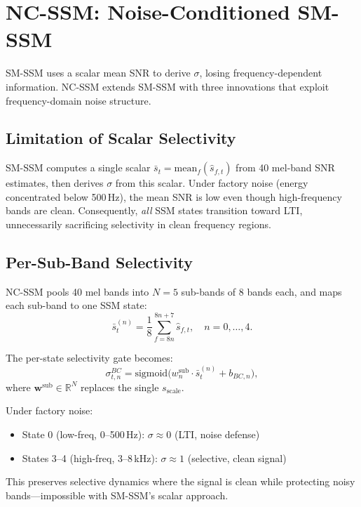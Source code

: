 \documentclass[journal]{IEEEtran}
\begin{document}
\section{NC-SSM: Noise-Conditioned SM-SSM}
\label{sec:ncssm}

SM-SSM uses a scalar mean SNR to derive $\sigma$, losing frequency-dependent information. NC-SSM extends SM-SSM with three innovations that exploit frequency-domain noise structure.

\subsection{Limitation of Scalar Selectivity}

SM-SSM computes a single scalar $\bar{s}_t = \text{mean}_f(\hat{s}_{f,t})$ from 40 mel-band SNR estimates, then derives $\sigma$ from this scalar.
Under factory noise (energy concentrated below 500\,Hz), the mean SNR is low even though high-frequency bands are clean.
Consequently, \emph{all} SSM states transition toward LTI, unnecessarily sacrificing selectivity in clean frequency regions.

\subsection{Per-Sub-Band Selectivity}
\label{sec:subband}

NC-SSM pools 40 mel bands into $N{=}5$ sub-bands of 8 bands each, and maps each sub-band to one SSM state:
\begin{equation}
\bar{s}^{(n)}_t = \frac{1}{8} \sum_{f=8n}^{8n+7} \hat{s}_{f,t}, \quad n = 0, \ldots, 4.
\label{eq:subband_snr}
\end{equation}

The per-state selectivity gate becomes:
\begin{equation}
\sigma^{BC}_{t,n} = \text{sigmoid}\big(w^{\text{sub}}_n \cdot \bar{s}^{(n)}_t + b_{BC,n}\big),
\label{eq:nc_sigma}
\end{equation}
where $\mathbf{w}^{\text{sub}} \in \mathbb{R}^N$ replaces the single $s_{\text{scale}}$.

\smallskip
Under factory noise:
\begin{itemize}
\setlength\itemsep{0pt}
\item State 0 (low-freq, 0--500\,Hz): $\sigma \approx 0$ (LTI, noise defense)
\item States 3--4 (high-freq, 3--8\,kHz): $\sigma \approx 1$ (selective, clean signal)
\end{itemize}
This preserves selective dynamics where the signal is clean while protecting noisy bands---impossible with SM-SSM's scalar approach.
\end{document}
